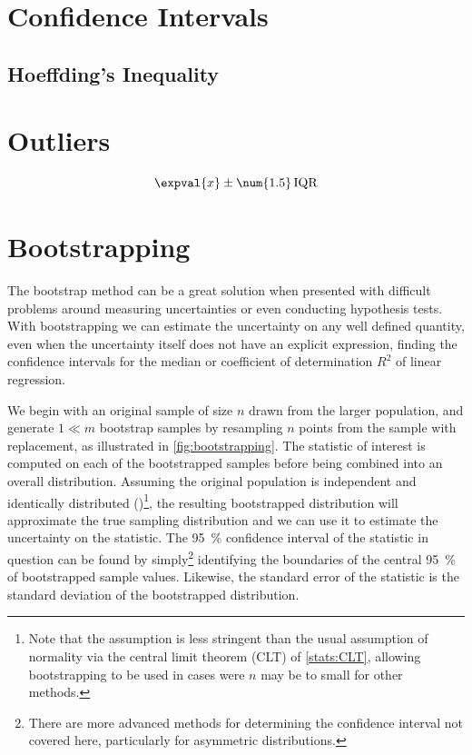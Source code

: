 \section{Confidence Intervals}
\label{stats:CI}

\subsection{Hoeffding's Inequality}
\label{stats:CI:hoeffding}

\section{Outliers}
\label{stats:outliers}

\begin{equation}\label{eq:stats:outlier_IQR_def}
\expval{x} \pm \num{1.5}\, \text{IQR}
\end{equation}

\section{Bootstrapping}
\label{stats:bootstrapping}

The bootstrap method can be a great solution when presented with difficult problems
around measuring uncertainties or even conducting hypothesis tests.
With bootstrapping we can estimate the uncertainty on any well defined quantity,
even when the uncertainty itself does not have an explicit expression,
\eg finding the confidence intervals for the median
or coefficient of determination $R^{2}$ of linear regression.

We begin with an original sample of size $n$ drawn from the larger population,
and generate $1 \ll m$ bootstrap samples by resampling $n$ points from the sample with replacement,
as illustrated in \cref{fig:bootstrapping}.
The statistic of interest is computed on each of the bootstrapped samples
before being combined into an overall distribution.
Assuming the original population is independent and identically distributed (\iid)\footnote{Note
that the \iid assumption is less stringent than
the usual assumption of normality via the central limit theorem (CLT) of \cref{stats:CLT},
allowing bootstrapping to be used in cases were $n$ may be to small for other methods.},
the resulting bootstrapped distribution will approximate the true sampling distribution
and we can use it to estimate the uncertainty on the statistic.
The \SI{95}{\percent} confidence interval of the statistic in question
can be found by simply\footnote{There are
more advanced methods for determining the confidence interval not covered here,
particularly for asymmetric distributions.} identifying
the boundaries of the central \SI{95}{\percent} of bootstrapped sample values.
Likewise, the standard error of the statistic is the standard deviation of the bootstrapped distribution.

